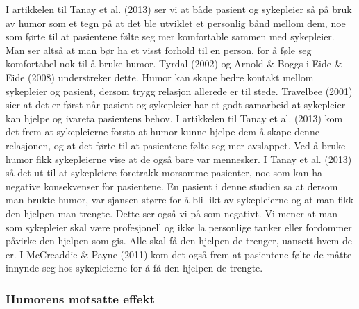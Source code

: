 I artikkelen til Tanay et al. (2013) ser vi at både pasient og sykepleier så på
bruk av humor som et tegn på at det ble utviklet et personlig bånd mellom dem,
noe som førte til at pasientene følte seg mer komfortable sammen med
sykepleier. Man ser altså at man bør ha et visst forhold til en person, for å
føle seg komfortabel nok til å bruke humor. Tyrdal (2002) og Arnold \&{} Boggs i
Eide \&{} Eide (2008) understreker dette. Humor kan skape bedre kontakt mellom
sykepleier og pasient, dersom trygg relasjon allerede er til stede.  Travelbee
(2001) sier at det er først når pasient og sykepleier har et godt samarbeid at
sykepleier kan hjelpe og ivareta pasientens behov. I artikkelen til Tanay et
al. (2013) kom det frem at sykepleierne forsto at humor kunne hjelpe dem å
skape denne relasjonen, og at det førte til at pasientene følte seg mer
avslappet. Ved å bruke humor fikk sykepleierne vise at de også bare var
mennesker.  I Tanay et al. (2013) så det ut til at sykepleiere foretrakk
morsomme pasienter, noe som kan ha negative konsekvenser for pasientene. En
pasient i denne studien sa at dersom man brukte humor, var sjansen større for å
bli likt av sykepleierne og at man fikk den hjelpen man trengte. Dette ser også
vi på som negativt. Vi mener at man som sykepleier skal være profesjonell og
ikke la personlige tanker eller fordommer påvirke den hjelpen som gis. Alle
skal få den hjelpen de trenger, uansett hvem de er. I McCreaddie \&{} Payne (2011)
kom det også frem at pasientene følte de måtte innynde seg hos sykepleierne for
å få den hjelpen de trengte.

\subsubsection{Humorens motsatte effekt}

